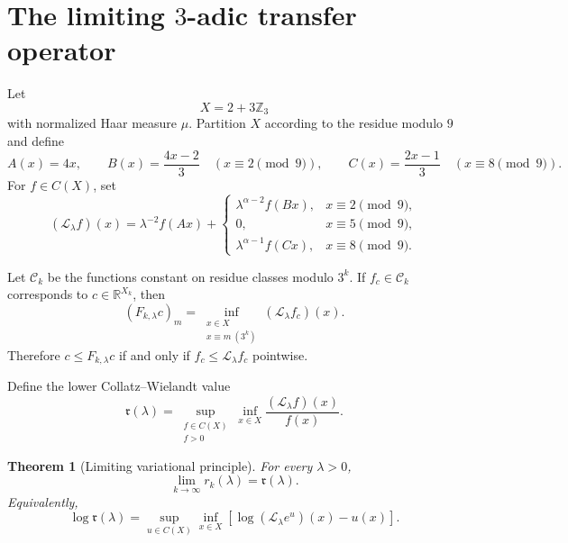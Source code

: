 \documentclass[11pt]{amsart}
\numberwithin{equation}{section}
\newtheorem{theorem}{Theorem}[section]
\begin{document}
\section{The limiting $3$-adic transfer operator}\label{sec:3adic-operator}

Let
\[
X=2+3\mathbb Z_3
\]
with normalized Haar measure $\mu$.  Partition $X$ according to the residue modulo $9$ and define
\[
A(x)=4x,
\qquad
B(x)=\frac{4x-2}{3}\quad(x\equiv2\pmod9),
\qquad
C(x)=\frac{2x-1}{3}\quad(x\equiv8\pmod9).
\]
For $f\in C(X)$, set
\begin{equation}\label{eq:transfer-operator}
(\mathcal L_\lambda f)(x)
=
\lambda^{-2}f(Ax)
+
\begin{cases}
\lambda^{\alpha-2}f(Bx),&x\equiv2\pmod9,\\
0,&x\equiv5\pmod9,\\
\lambda^{\alpha-1}f(Cx),&x\equiv8\pmod9.
\end{cases}
\end{equation}

Let $\mathcal C_k$ be the functions constant on residue classes modulo $3^k$.  If $f_c\in\mathcal C_k$ corresponds to $c\in\mathbb R^{X_k}$, then
\begin{equation}\label{eq:cylinder-inf}
(F_{k,\lambda}c)_m
=
\inf_{\substack{x\in X\\x\equiv m\ (3^k)}}
(\mathcal L_\lambda f_c)(x).
\end{equation}
Therefore $c\le F_{k,\lambda}c$ if and only if $f_c\le\mathcal L_\lambda f_c$ pointwise.

Define the lower Collatz--Wielandt value
\begin{equation}\label{eq:mathfrak-r}
\mathfrak r(\lambda)
=
\sup_{\substack{f\in C(X)\\f>0}}
\inf_{x\in X}
\frac{(\mathcal L_\lambda f)(x)}{f(x)}.
\end{equation}

\begin{theorem}[Limiting variational principle]\label{thm:limiting-variational}
For every $\lambda>0$,
\begin{equation}\label{eq:rk-limit}
\lim_{k\to\infty}r_k(\lambda)=\mathfrak r(\lambda).
\end{equation}
Equivalently,
\begin{equation}\label{eq:log-variational}
\log\mathfrak r(\lambda)
=
\sup_{u\in C(X)}
\inf_{x\in X}
\left[
\log(\mathcal L_\lambda e^u)(x)-u(x)
\right].
\end{equation}
\end{theorem}
\end{document}
